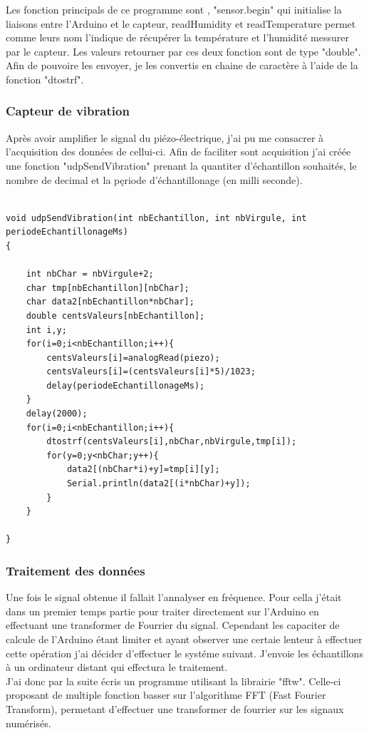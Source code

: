 \documentclass[11pt,french,a4paper]{article}
\begin{document}
Les fonction principals de ce programme sont , "sensor.begin" qui initialise la liaisons entre l'Arduino et le capteur, readHumidity et readTemperature permet comme leurs nom l'indique de récupérer la température et l'humidité messurer par le capteur. Les valeurs retourner par ces deux fonction sont de type "double". Afin de pouvoire les envoyer, je les convertis en chaine de caractère à l'aide de la fonction "dtostrf".

\subsubsection{Capteur de vibration}
Après avoir amplifier le signal du piézo-électrique, j'ai pu me consacrer à l'acquisition des données de cellui-ci. Afin de faciliter sont acquisition j'ai créée une fonction "udpSendVibration" prenant la quantiter d'échantillon souhaités, le nombre de decimal et la pęriode d'échantillonage (en milli seconde).
\begin{scriptsize}
\begin{lstlisting}

void udpSendVibration(int nbEchantillon, int nbVirgule, int periodeEchantillonageMs)
{

	int nbChar = nbVirgule+2;
	char tmp[nbEchantillon][nbChar];
	char data2[nbEchantillon*nbChar];
	double centsValeurs[nbEchantillon];
	int i,y;
	for(i=0;i<nbEchantillon;i++){
		centsValeurs[i]=analogRead(piezo);
		centsValeurs[i]=(centsValeurs[i]*5)/1023;
		delay(periodeEchantillonageMs);
	}
	delay(2000);
	for(i=0;i<nbEchantillon;i++){
		dtostrf(centsValeurs[i],nbChar,nbVirgule,tmp[i]);
		for(y=0;y<nbChar;y++){
			data2[(nbChar*i)+y]=tmp[i][y];
			Serial.println(data2[(i*nbChar)+y]);	
		}	
	}

}
\end{lstlisting}
\end{scriptsize} 

\subsubsection{Traitement des données}
Une fois le signal obtenue il fallait l'annalyser en fréquence. Pour cella j'était dans un premier temps partie pour traiter directement sur l'Arduino en effectuant une transformer de Fourrier du signal. Cependant les capaciter de calcule de l'Arduino étant limiter et ayant observer une certaie lenteur à effectuer cette opération j'ai décider d'effectuer le systéme suivant. J'envoie les échantillons à un ordinateur distant qui effectura le traitement.\\
J'ai donc par la suite écris un programme utilisant la librairie "fftw". Celle-ci proposant de multiple fonction basser sur l'algorithme FFT (Fast Fourier Transform), permetant d'effectuer une transformer de fourrier sur les signaux numérisés.
\end{document}
